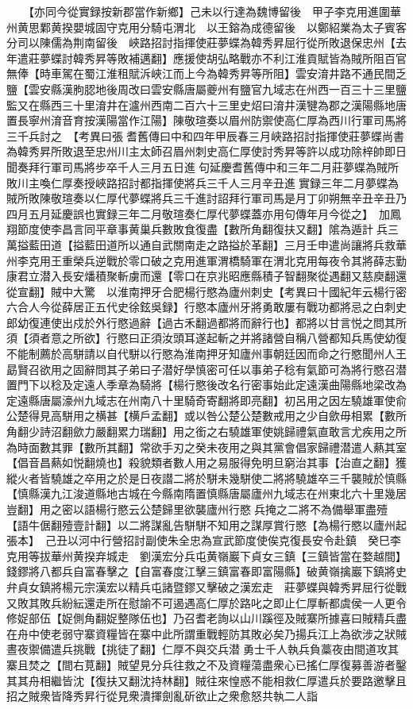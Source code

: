 　　【亦同今從實録按新郡當作新鄉】己未以行達為魏博留後　甲子李克用進圍華州黄思鄴黄揆嬰城固守克用分騎屯渭北　以王鎔為成德留後　以鄭紹業為太子賓客分司以陳儒為荆南留後　峽路招討指揮使莊夢蝶為韓秀昇屈行從所敗退保忠州【去年遣莊夢蝶討韓秀昇等敗補邁翻】應援使胡弘略戰亦不利江淮貢賦皆為賊所阻百官無俸【時車駕在蜀江淮租賦泝峽江而上今為韓秀昇等所阻】雲安淯井路不通民間乏鹽【雲安縣漢朐䏰地後周改曰雲安縣唐屬夔州有鹽官九域志在州西一百三十三里鹽監又在縣西三十里淯井在瀘州西南二百六十三里史炤曰淯井漢犍為郡之漢陽縣地唐置長寧州淯音育按漢陽當作江陽】陳敬瑄奏以眉州防禦使高仁厚為西川行軍司馬將三千兵討之　【考異曰張耆舊傳曰中和四年甲辰春三月峽路招討指揮使莊夢蝶尚書為韓秀昇所敗退至忠州川主太師召眉州刺史高仁厚使討秀昇等許以成功除梓帥即日聞奏拜行軍司馬將步卒千人三月五日進句延慶耆舊傳中和三年二月莊夢蝶為賊所敗川主喚仁厚奏授峽路招討都指揮使將兵三千人三月辛丑進實録三年二月夢蝶為賊所敗陳敬瑄奏以仁厚代夢蝶將兵三千進討詔拜行軍司馬是月丁卯朔無辛丑辛丑乃四月五月延慶誤也實録三年二月敬瑄奏仁厚代夢蝶蓋亦用句傳年月今從之】　加鳳翔節度使李昌言同平章事黄巢兵數敗食復盡【數所角翻復扶又翻】隂為遁計兵三萬搤藍田道【搤藍田道所以通自武關南走之路搤於革翻】三月壬申遣尚讓將兵救華州李克用王重榮兵逆戰於零口破之克用進軍渭橋騎軍在渭北克用每夜令其將薛志勤康君立潜入長安燔積聚斬虜而還【零口在京兆昭應縣積子智翻聚從遇翻又慈庾翻還從宣翻】賊中大驚　以淮南押牙合肥楊行愍為廬州刺史【考異曰十國紀年云楊行密六合人今從薛居正五代史徐鉉吳録】行愍本廬州牙將勇敢屢有戰功都將忌之白刺史郎幼復連使出戍於外行愍過辭【過古禾翻過都將而辭行也】都將以甘言悦之問其所須【須者意之所欲】行愍曰正須汝頭耳遂起斬之并將諸營自稱八營都知兵馬使幼復不能制薦於高駢請以自代駢以行愍為淮南押牙知廬州事朝廷因而命之行愍聞州人王勗賢召欲用之固辭問其子弟曰子潜好學慎密可任以事弟子稔有氣節可為將行愍召潜置門下以稔及定遠人季章為騎將【楊行愍後改名行密事始此定遠漢曲陽縣地梁改為定遠縣唐屬濠州九域志在州南八十里騎奇寄翻將即亮翻】初呂用之因左驍雄軍使俞公楚得見高駢用之横甚【横戶孟翻】或以咎公楚公楚數戒用之少自歛毋相累【數所角翻少詩沼翻歛力嚴翻累力瑞翻】用之銜之右驍雄軍使姚歸禮氣直敢言尤疾用之所為時面數其罪【數所其翻】常欲手刃之癸未夜用之與其黨會倡家歸禮潜遣人爇其室【倡音昌爇如悦翻燒也】殺貌類者數人用之易服得免明旦窮治其事【治直之翻】獲縱火者皆驍雄之卒用之於是日夜譛二將於駢未幾駢使二將將驍雄卒三千襲賊於慎縣【慎縣漢九江浚道縣地古城在今縣南隋置慎縣唐屬廬州九域志在州東北六十里幾居豈翻】用之密以語楊行愍云公楚歸里欲襲廬州行愍兵掩之二將不為備舉軍盡殪【語牛倨翻殪壹計翻】以二將謀亂告駢駢不知用之謀厚賞行愍【為楊行愍以廬州起張本】　己丑以河中行營招討副使朱全忠為宣武節度使俟克復長安令赴鎮　癸巳李克用等拔華州黄揆弃城走　劉漢宏分兵屯黄嶺巖下貞女三鎮【三鎮皆當在婺越間】錢鏐將八都兵自富春擊之【自富春度江擊三鎮富春即富陽縣】破黄嶺擒巖下鎮將史弁貞女鎮將楊元宗漢宏以精兵屯諸暨鏐又擊破之漢宏走　莊夢蝶與韓秀昇屈行從戰又敗其敗兵紛紜還走所在慰諭不可遏遇高仁厚於路叱之即止仁厚斬都虞侯一人更令修娖部伍【娖側角翻娖整隊伍也】乃召耆老詢以山川蹊徑及賊寨所據喜曰賊精兵盡在舟中使老弱守寨資糧皆在寨中此所謂重戰輕防其敗必矣乃揚兵江上為欲涉之狀賊晝夜禦備遣兵挑戰【挑徒了翻】仁厚不與交兵潜勇士千人執兵負藁夜由間道攻其寨且焚之【間右莧翻】賊望見分兵往救之不及資糧蕩盡衆心已搖仁厚復募善游者鑿其其舟相繼皆沈【復扶又翻沈持林翻】賊往來惶惑不能相救仁厚遣兵於要路邀擊且招之賊衆皆降秀昇行從見衆潰揮劍亂斫欲止之衆愈怒共執二人詣
